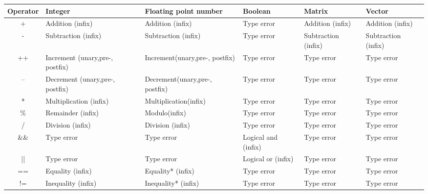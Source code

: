 \begin{table}[h]
    \centering
    \begin{tabular}{|c|l|l|l|l|l|}
    \hline
    \textbf{Operator}  & \textbf{Integer}                   & \textbf{Floating point number}    & \textbf{Boolean}      & \textbf{Matrix}       & \textbf{Vector}     \\ \hline
    +                  & Addition (infix)                   & Addition (infix)                  & Type error            & Addition (infix)      & Addition (infix) \\ \hline 
    -                  & Subtraction (infix)                & Subtraction (infix)               & Type error            & Subtraction (infix)   & Subtraction (infix) \\ \hline 
    ++                 & Increment (unary,pre-, postfix)    & Increment(unary,pre-, postfix)    & Type error            & Type error            & Type error \\ \hline    
    --                 & Decrement (unary,pre-, postfix)    & Decrement(unary,pre-, postfix)    & Type error            & Type error            & Type error \\ \hline
    *                  & Multiplication (infix)             & Multiplication(infix)             & Type error            & Type error            & Type error      \\ \hline
    \%                 & Remainder (infix)                  & Modulo(infix)                     & Type error            & Type error            & Type error  \\ \hline
    /                  & Division (infix)                   & Division (infix)                  & Type error            & Type error            & Type error \\ \hline
    \&\&               & Type error                         & Type error                        & Logical and (infix)   & Type error            & Type error \\ \hline 
    ||                 & Type error                         & Type error                        & Logical or (infix)    & Type error            & Type error \\ \hline 
    ==                 & Equality (infix)                   & Equality* (infix)                 & Type error            & Type error            & Type error \\ \hline 
    !=                 & Inequality (infix)                 & Inequality* (infix)               & Type error            & Type error            & Type error \\ \hline

\end{tabular}
\end{table}
